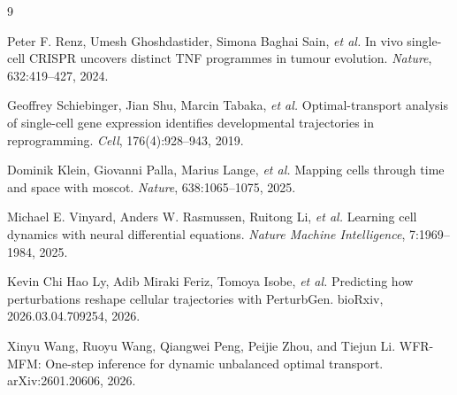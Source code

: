 \documentclass[11pt]{article}
\newcommand{\1}{\mathbf{1}}
\theoremstyle{plain}
\begin{document}
\begin{thebibliography}{9}

Peter F. Renz, Umesh Ghoshdastider, Simona Baghai Sain, \emph{et al.}
\newblock In vivo single-cell CRISPR uncovers distinct TNF programmes in tumour evolution.
\newblock \emph{Nature}, 632:419--427, 2024.

Geoffrey Schiebinger, Jian Shu, Marcin Tabaka, \emph{et al.}
\newblock Optimal-transport analysis of single-cell gene expression identifies developmental trajectories in reprogramming.
\newblock \emph{Cell}, 176(4):928--943, 2019.

Dominik Klein, Giovanni Palla, Marius Lange, \emph{et al.}
\newblock Mapping cells through time and space with moscot.
\newblock \emph{Nature}, 638:1065--1075, 2025.

Michael E. Vinyard, Anders W. Rasmussen, Ruitong Li, \emph{et al.}
\newblock Learning cell dynamics with neural differential equations.
\newblock \emph{Nature Machine Intelligence}, 7:1969--1984, 2025.

Kevin Chi Hao Ly, Adib Miraki Feriz, Tomoya Isobe, \emph{et al.}
\newblock Predicting how perturbations reshape cellular trajectories with PerturbGen.
\newblock bioRxiv, 2026.03.04.709254, 2026.

Xinyu Wang, Ruoyu Wang, Qiangwei Peng, Peijie Zhou, and Tiejun Li.
\newblock WFR-MFM: One-step inference for dynamic unbalanced optimal transport.
\newblock arXiv:2601.20606, 2026.

\end{thebibliography}
\end{document}
